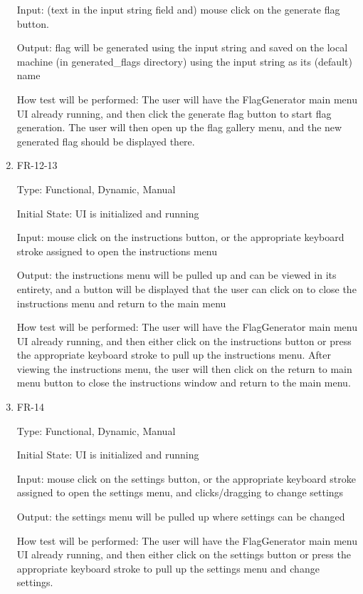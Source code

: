 \documentclass[12pt, titlepage]{article}
\begin{document}
\begin{enumerate}
Input: (text in the input string field and) mouse click on the generate flag button.

Output: flag will be generated using the input string and saved on the local
machine (in \/generated\_flags directory) using the input string as its
(default) name

How test will be performed: The user will have the FlagGenerator main menu UI
already running, and then click the generate flag button to start flag
generation. The user will then open up the flag gallery menu, and the new
generated flag should be displayed there.

\item{FR-12-13\\}

Type: Functional, Dynamic, Manual

Initial State: UI is initialized and running

Input: mouse click on the instructions button, or the appropriate keyboard
stroke assigned to open the instructions menu

Output: the instructions menu will be pulled up and can be viewed in its
entirety, and a button will be displayed that the user can click on to close
the instructions menu and return to the main menu

How test will be performed: The user will have the FlagGenerator main menu UI
already running, and then either click on the instructions button or press the
appropriate keyboard stroke to pull up the instructions menu. After viewing
the instructions menu, the user will then click on the return to main menu
button to close the instructions window and return to the main menu.

\item{FR-14\\}

Type: Functional, Dynamic, Manual

Initial State: UI is initialized and running

Input: mouse click on the settings button, or the appropriate keyboard stroke
assigned to open the settings menu, and clicks/dragging to change settings

Output: the settings menu will be pulled up where settings can be changed

How test will be performed: The user will have the FlagGenerator main menu UI
already running, and then either click on the settings button or press the
appropriate keyboard stroke to pull up the settings menu and change settings.


\end{enumerate}
\end{document}
